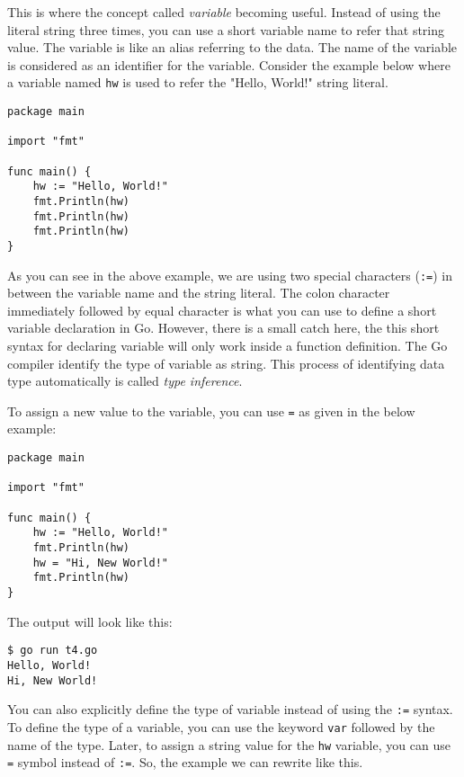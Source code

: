 

This is where the concept called \textit{variable}
becoming useful.  Instead of using the literal string three times, you
can use a short variable name to refer that string value.  The
variable is like an alias referring to the data.  The name of the
variable is considered as an identifier for the variable.  Consider
the example below where a variable named \texttt{hw} is used to refer
the "Hello, World!" string literal.

\begin{lstlisting}[caption=Reusing variable]
package main

import "fmt"

func main() {
    hw := "Hello, World!"
    fmt.Println(hw)
    fmt.Println(hw)
    fmt.Println(hw)
}
\end{lstlisting}

As you can see in the above example, we are using two special
characters (\texttt{:=}) in between the variable name and the string
literal.  The colon character immediately followed by equal character
is what you can use to define a short variable declaration in Go.
However, there is a small catch here, the this short syntax for
declaring variable will only work inside a function definition. The Go
compiler identify the type of variable as string.  This process of
identifying data type automatically is called \textit{type inference}.

To assign a new value to the variable, you can use \texttt{=} as given
in the below example:

\begin{lstlisting}[caption=Assign new value to variable]
package main

import "fmt"

func main() {
    hw := "Hello, World!"
    fmt.Println(hw)
    hw = "Hi, New World!"
    fmt.Println(hw)
}
\end{lstlisting}

The output will look like this:

\begin{lstlisting}[numbers=none]
$ go run t4.go
Hello, World!
Hi, New World!
\end{lstlisting}

You can also explicitly define the type of variable instead of using
the \texttt{:=} syntax.  To define the type of a variable, you can use
the keyword \texttt{var} followed by the name of the type.  Later, to
assign a string value for the \texttt{hw} variable, you can
use \texttt{=} symbol instead of \texttt{:=}.  So, the example we can
rewrite like this.

